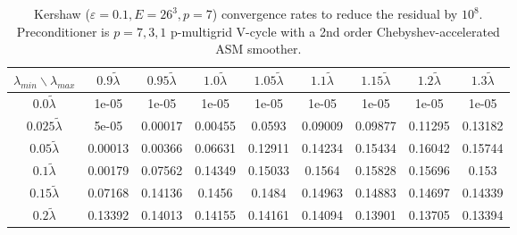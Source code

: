 \begin{table}
\centering
\begin{tabular}{||c| c c c c c c c c||}
  \hline
  $\lambda_{min}\backslash \lambda_{max}$ & $0.9 \tilde\lambda$ & $0.95 \tilde\lambda$ & $1.0 \tilde\lambda$ & $1.05 \tilde\lambda$ & $1.1 \tilde\lambda$ & $1.15 \tilde\lambda$ & $1.2 \tilde\lambda$ & $1.3 \tilde\lambda$  \\ 
\hline\hline
$0.0 \tilde\lambda$ & 1e-05 & 1e-05 & 1e-05 & 1e-05 & 1e-05 & 1e-05 & 1e-05 & 1e-05 \\ 
$0.025 \tilde\lambda$ & 5e-05 & 0.00017 & 0.00455 & 0.0593 & 0.09009 & 0.09877 & 0.11295 & 0.13182 \\ 
$0.05 \tilde\lambda$ & 0.00013 & 0.00366 & 0.06631 & 0.12911 & 0.14234 & 0.15434 & 0.16042 & 0.15744 \\ 
$0.1 \tilde\lambda$ & 0.00179 & 0.07562 & 0.14349 & 0.15033 & 0.1564 & 0.15828 & 0.15696 & 0.153 \\ 
$0.15 \tilde\lambda$ & 0.07168 & 0.14136 & 0.1456 & 0.1484 & 0.14963 & 0.14883 & 0.14697 & 0.14339 \\ 
$0.2 \tilde\lambda$ & 0.13392 & 0.14013 & 0.14155 & 0.14161 & 0.14094 & 0.13901 & 0.13705 & 0.13394 \\ 
\hline
\end{tabular}
\caption{
  Kershaw ($\varepsilon=0.1, E=26^3, p=7$) convergence rates to reduce the residual by $10^8$.
  Preconditioner is $p=7,3,1$ p-multigrid V-cycle with a 2nd order Chebyshev-accelerated ASM smoother.
  \label{table:kershaw-eig-multiplier-conv-0.1}}
\end{table}
